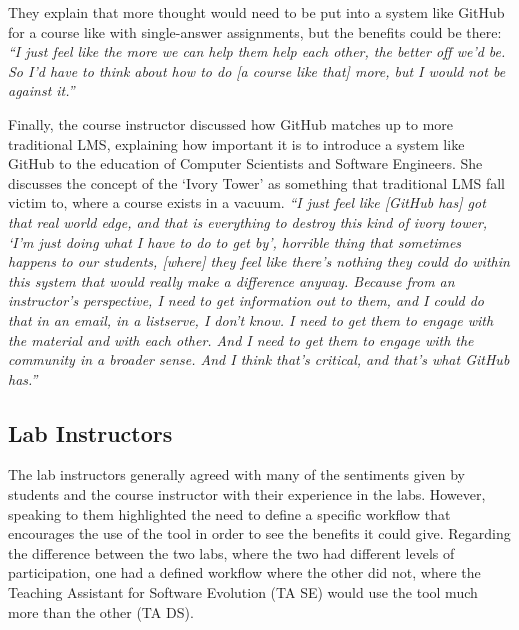 They explain that more thought would need to be put into a system like GitHub for a course like with single-answer assignments, but the benefits could be there: \textit{``I just feel like the more we can help them help each other, the better off we'd be. So I'd have to think about how to do [a course like that] more, but I would not be against it.''}

Finally, the course instructor discussed how GitHub matches up to more traditional LMS, explaining how important it is to introduce a system like GitHub to the education of Computer Scientists and Software Engineers. She discusses the concept of the `Ivory Tower' as something that traditional LMS fall victim to, where a course exists in a vacuum. \textit{``I just feel like [GitHub has] got that real world edge, and that is everything to destroy this kind of ivory tower, `I'm just doing what I have to do to get by', horrible thing that sometimes happens to our students, [where] they feel like there's nothing they could do within this system that would really make a difference anyway. Because from an instructor's perspective, I need to get information out to them, and I could do that in an email, in a listserve, I don't know. I need to get them to engage with the material and with each other. And I need to get them to engage with the community in a broader sense. And I think that's critical, and that's what GitHub has.''}



\subsection{Lab Instructors}
The lab instructors generally agreed with many of the sentiments given by students and the course instructor with their experience in the labs. However, speaking to them highlighted the need to define a specific workflow that encourages the use of the tool in order to see the benefits it could give. Regarding the difference between the two labs, where the two had different levels of participation, one had a defined workflow where the other did not, where the Teaching Assistant for Software Evolution (TA SE) would use the tool much more than the other (TA DS).

